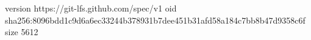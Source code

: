 version https://git-lfs.github.com/spec/v1
oid sha256:8096bdd1c9d6a6ec33244b378931b7dee451b31afd58a184c7bb8b47d9358c6f
size 5612
